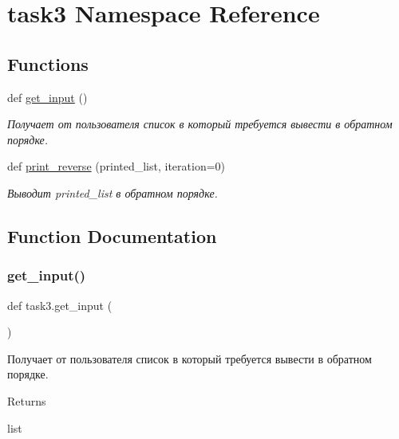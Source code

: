 \hypertarget{namespacetask3}{}\section{task3 Namespace Reference}
\label{namespacetask3}
\subsection*{Functions}
\begin{DoxyCompactItemize}
\item 
def \hyperlink{namespacetask3_a3abfb605e25c6f868c74db68bf2871ca}{get\+\_\+input} ()
\begin{DoxyCompactList}\small\item\em Получает от пользователя список в который требуется вывести в обратном порядке. \end{DoxyCompactList}\item 
def \hyperlink{namespacetask3_ae050e9748a187587d4195a9c315d8a9b}{print\+\_\+reverse} (printed\+\_\+list, iteration=0)
\begin{DoxyCompactList}\small\item\em Выводит printed\+\_\+list в обратном порядке. \end{DoxyCompactList}\end{DoxyCompactItemize}


\subsection{Function Documentation}
\mbox{\label{namespacetask3_a3abfb605e25c6f868c74db68bf2871ca}} 
\subsubsection{\texorpdfstring{get\+\_\+input()}{get\_input()}}
{\footnotesize\ttfamily def task3.\+get\+\_\+input (\begin{DoxyParamCaption}{ }\end{DoxyParamCaption})}



Получает от пользователя список в который требуется вывести в обратном порядке. 

\begin{DoxyReturn}{Returns}


list 
\end{DoxyReturn}
\mbox{\label{namespacetask3_ae050e9748a187587d4195a9c315d8a9b}} 
